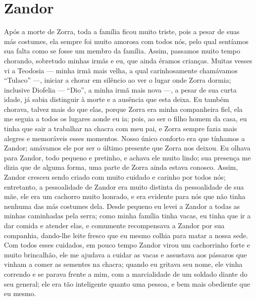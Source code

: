 \cleardoublepage
\newpage
{}
\chapter{Zandor}

Após a morte de Zorra, toda a família ficou muito triste, pois a pesar de suas más costumes, ela sempre foi muito amorosa com todos nós, pelo qual sentíamos sua falta como se fosse um membro da família. 
Assim, passamos muito tempo chorando, sobretudo minhas irmãs e eu, que ainda éramos crianças. 
Muitas vesses vi a Teodosia ---  minha irmã mais velha, a qual carinhosamente chamávamos ``Tulaco'' ---, iniciar a chorar em silêncio ao ver o lugar onde Zorra dormia; inclusive Diofelia  --- ``Dio'', a minha irmã mais nova ---, a pesar de sua curta idade, já sabia distinguir à morte e a ausência que esta deixa. 
Eu também chorava, talvez mais do que elas, porque Zorra era minha companheira fiel, ela me seguia a todos os lugares aonde eu ia; pois, ao ser o filho homem da casa, eu tinha que sair a trabalhar na chacra com meu pai, e Zorra sempre fazia mais alegres e memoráveis esses momentos.
Nosso único conforto era que tínhamos a Zandor; amávamos ele por ser o último presente que Zorra nos deixou.
Eu olhava para Zandor, todo pequeno e pretinho, e achava ele muito lindo; sua presença me dizia que de alguma forma, uma parte de Zorra ainda estava conosco. 
Assim, Zandor cresceu sendo criado com muito cuidado e carinho por todos nós;
entretanto, a pessoalidade de Zandor era muito distinta da pessoalidade de sua mãe, ele era um cachorro muito honrado, e era evidente para nós que não tinha nenhuma das más costumes dela. 
Desde pequeno eu levei a Zandor a todas as minhas caminhadas pela serra; como minha família tinha vacas, eu tinha que ir a dar comida e atender elas, e comumente recompensava a Zandor por sua companhia, dando-lhe leite fresco que eu mesmo colhia para matar a nossa sede. 
Com todos esses cuidados, em pouco tempo Zandor virou um cachorrinho forte e muito brincalhão,
ele me ajudava a cuidar as vacas e assustava aos pássaros que vinham a comer as sementes na chacra; quando eu gritava seu nome, ele vinha correndo e se parava frente a mim, com a marcialidade de um soldado diante do seu general; ele era tão inteligente quanto uma pessoa, e bem mais obediente que eu mesmo.

